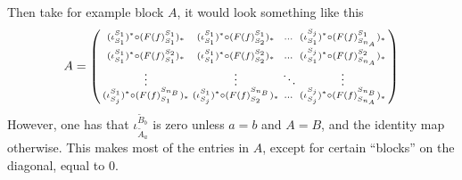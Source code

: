 \begin{remark}
    Then take for example block \( A \), it would look something like this
    \[
        A =
        \begin{psmallmatrix}
            ( \iota_{S_1}^{S_1} )^* \circ ( F(f)_{S_1}^{S_1} )_* &
            ( \iota_{S_1}^{S_1} )^* \circ ( F(f)_{S_2}^{S_1} )_* &
            \dots &
            ( \iota_{S_1}^{S_j} )^* \circ ( F(f)_{S_{n_A}}^{S_1} )_* \\
            ( \iota_{S_1}^{S_1} )^* \circ ( F(f)_{S_1}^{S_2} )_* &
            ( \iota_{S_1}^{S_1} )^* \circ ( F(f)_{S_2}^{S_2} )_* &
            \dots &
            ( \iota_{S_1}^{S_j} )^* \circ ( F(f)_{S_{n_A}}^{S_2} )_* \\
            \vdots &
            \vdots &
            \ddots &
            \vdots \\
            ( \iota_{S_j}^{S_1} )^* \circ ( F(f)_{S_1}^{S_{n_B}} )_* &
            ( \iota_{S_j}^{S_1} )^* \circ ( F(f)_{S_2}^{S_{n_B}} )_* &
            \dots &
            ( \iota_{S_j}^{S_j} )^* \circ ( F(f)_{S_{n_A}}^{S_{n_B}} )_*
        \end{psmallmatrix}
    \]
    However, one has that \( \iota_{\tilde{A}_a}^{\tilde{B}_b} \) is zero unless \( a = b \) and \( A = B \), and the identity map otherwise. This makes most of the entries in \( A \), except for certain ``blocks'' on the diagonal, equal to \( 0 \).


\end{remark}
